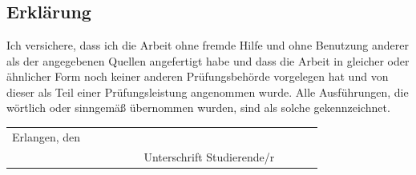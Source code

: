 \chapter*{}
\section*{Erklärung}\label{chapter:Erklaerung}

Ich versichere, dass ich die Arbeit ohne fremde Hilfe und ohne Benutzung anderer als der angegebenen Quellen angefertigt habe und dass die Arbeit in gleicher oder ähnlicher Form noch keiner anderen Prüfungsbehörde vorgelegen hat und von dieser als Teil einer Prüfungsleistung angenommen wurde. Alle Ausführungen, die wörtlich oder sinngemäß übernommen wurden, sind als solche gekennzeichnet.\newline \newline

\begin{tabularx}{\textwidth}{lXc}
Erlangen, den   &     & \\
\hhline{~~-}
 	  							&     &$\quad$ $\qquad$ Unterschrift Studierende/r $\qquad$$\quad$
\end{tabularx}
\newline
\newline
\newline
\newline
\newline

